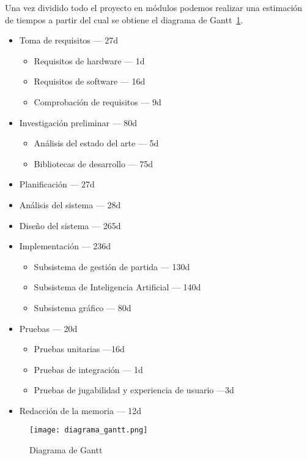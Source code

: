 Una vez dividido todo el proyecto en módulos podemos realizar una estimación de tiempos a partir del cual se
obtiene el diagrama de Gantt~\ref{fig:diag_gantt}.

\begin{itemize}
    \item Toma de requisitos --- 27d
        \begin{itemize}
            \item Requisitos de hardware --- 1d
            \item Requisitos de software --- 16d
            \item Comprobación de requisitos --- 9d
        \end{itemize}
    \item Investigación preliminar --- 80d
        \begin{itemize}
            \item Análisis del estado del arte --- 5d
            \item Bibliotecas de desarrollo --- 75d
        \end{itemize}
    \item Planificación --- 27d
    \item Análisis del sistema --- 28d
    \item Diseño del sistema --- 265d
    \item Implementación --- 236d
        \begin{itemize}
            \item Subsistema de gestión de partida --- 130d
            \item Subsistema de Inteligencia Artificial --- 140d
            \item Subsistema gráfico --- 80d
        \end{itemize}
    \item Pruebas --- 20d
        \begin{itemize}
            \item Pruebas unitarias ---16d
            \item Pruebas de integración --- 1d
            \item Pruebas de jugabilidad y experiencia de usuario ---3d
        \end{itemize}
    \item Redacción de la memoria --- 12d
\end{itemize}

\begin{figure}[h]
  \begin{center}
    \texttt{[image: diagrama\_gantt.png]}
  \end{center}
  \caption{Diagrama de Gantt}
  \label{fig:diag_gantt}
\end{figure}
